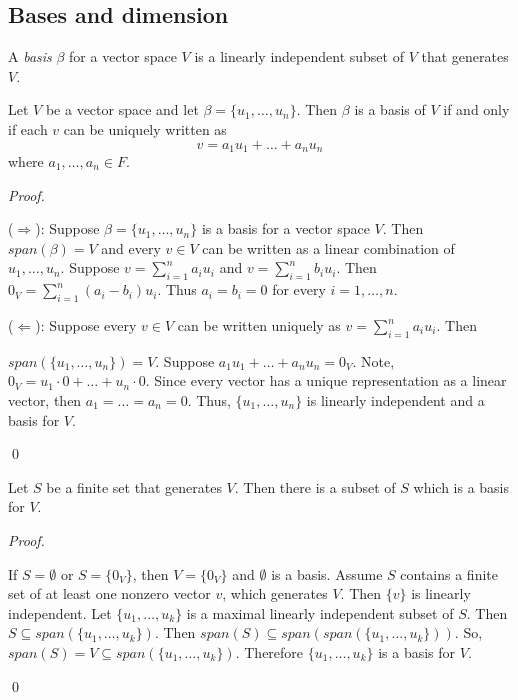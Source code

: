 \documentclass[12pt]{article}
\newenvironment{theorem}[2][Theorem]{\begin{trivlist}
\item[\hskip \labelsep {\bfseries #1}\hskip \labelsep {\bfseries #2.}]}{\end{trivlist}}
\newenvironment{definition}[2][Definition]{\begin{trivlist}
\item[\hskip \labelsep {\bfseries #1}\hskip \labelsep {\bfseries #2}]}{\end{trivlist}}
\newenvironment{sol}
    {\emph{Proof.}
    }
    {
    \qed
    }
\begin{document}
\subsection{Bases and dimension}

\begin{definition}{8}
A \textit{basis} $\beta$ for a vector space $V$ is a linearly independent subset of $V$ that generates $V$.
\end{definition}

\begin{theorem}{1.8}
Let $V$ be a vector space and let $\beta = \{u_1, \dots, u_n\}$. Then $\beta$ is a basis of $V$ if and only if each $v$ can be uniquely written as $$v = a_1u_1 + \dots + a_nu_n$$ where $a_1, \dots, a_n \in F$.
\end{theorem}

\begin{sol}
($\Longrightarrow$): Suppose $\beta = \{u_1, \dots, u_n\}$ is a basis for a vector space $V$. Then $span(\beta) = V$ and every $v \in V$ can be written as a linear combination of $u_1, \dots, u_n$. Suppose $v = \sum_{i = 1}^na_iu_i$ and $v = \sum_{i = 1}^nb_iu_i$. Then $0_V = \sum_{i = 1}^n(a_i - b_i)u_i$. Thus $a_i = b_i = 0$ for every $i = 1, \dots, n$.

($\Longleftarrow$): Suppose every $v \in V$ can be written uniquely as $v = \sum_{i = 1}^na_iu_i$. Then 

\noindent$span(\{u_1, \dots, u_n\}) = V$. Suppose $a_1u_1 + \dots + a_nu_n = 0_V$. Note, $0_V = u_1 \cdot 0 + \dots + u_n \cdot 0$. Since every vector has a unique representation as a linear vector, then $a_1 = \dots = a_n = 0$. Thus, $\{u_1, \dots, u_n\}$ is linearly independent and a basis for $V$.
\end{sol}

\begin{theorem}{1.9}
Let $S$ be a finite set that generates $V$. Then there is a subset of $S$ which is a basis for $V$.
\end{theorem}

\begin{sol}
If $S = \emptyset$ or $S = \{0_V\}$, then $V = \{0_V\}$ and $\emptyset$ is a basis. Assume $S$ contains a finite set of at least one nonzero vector $v$, which generates $V$. Then $\{v\}$ is linearly independent. Let $\{u_1, \dots, u_k\}$ is a maximal linearly independent subset of $S$. Then $S \subseteq span(\{u_1, \dots, u_k\})$. Then $span(S) \subseteq span(span(\{u_1, \dots, u_k\}))$. So, $span(S) = V \subseteq span(\{u_1, \dots, u_k\})$. Therefore $\{u_1, \dots, u_k\}$ is a basis for $V$.
\end{sol}
\end{document}
